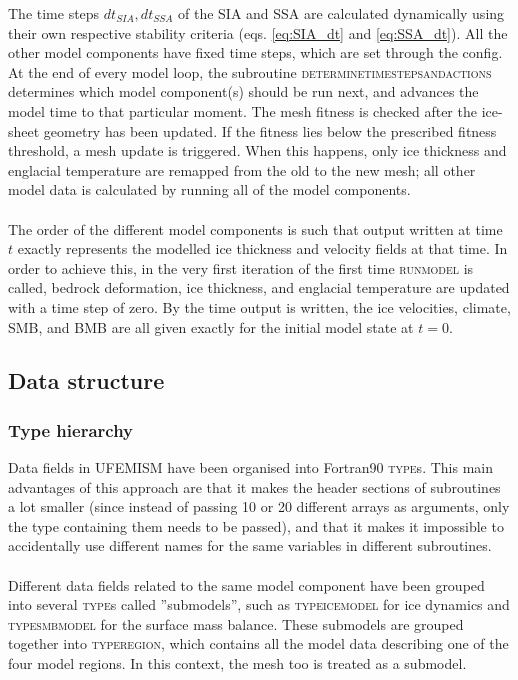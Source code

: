 \documentclass{article}
\begin{document}
The time steps $dt_{SIA}, dt_{SSA}$ of the SIA and SSA are calculated dynamically using their own respective stability criteria (eqs. \eqref{eq:SIA_dt} and \eqref{eq:SSA_dt}). All the other model components have fixed time steps, which are set through the config. At the end of every model loop, the subroutine \textsc{determine\textunderscore timesteps\textunderscore and\textunderscore actions} determines which model component(s) should be run next, and advances the model time to that particular moment. The mesh fitness is checked after the ice-sheet geometry has been updated. If the fitness lies below the prescribed fitness threshold, a mesh update is triggered. When this happens, only ice thickness and englacial temperature are remapped from the old to the new mesh; all other model data is calculated by running all of the model components.\\
\\
The order of the different model components is such that output written at time $t$ exactly represents the modelled ice thickness and velocity fields at that time. In order to achieve this, in the very first iteration of the first time \textsc{run\textunderscore model} is called, bedrock deformation, ice thickness, and englacial temperature are updated with a time step of zero. By the time output is written, the ice velocities, climate, SMB, and BMB are all given exactly for the initial model state at $t=0$.

\subsection{Data structure}

\subsubsection{Type hierarchy}

Data fields in UFEMISM have been organised into Fortran90 \textsc{type}s. This main advantages of this approach are that it makes the header sections of subroutines a lot smaller (since instead of passing 10 or 20 different arrays as arguments, only the type containing them needs to be passed), and that it makes it impossible to accidentally use different names for the same variables in different subroutines.\\
\\
Different data fields related to the same model component have been grouped into several \textsc{type}s called ''submodels'', such as \textsc{type\textunderscore ice\textunderscore model} for ice dynamics and \textsc{type\textunderscore smb\textunderscore model} for the surface mass balance. These submodels are grouped together into \textsc{type\textunderscore region}, which contains all the model data describing one of the four model regions. In this context, the mesh too is treated as a submodel.
\end{document}

